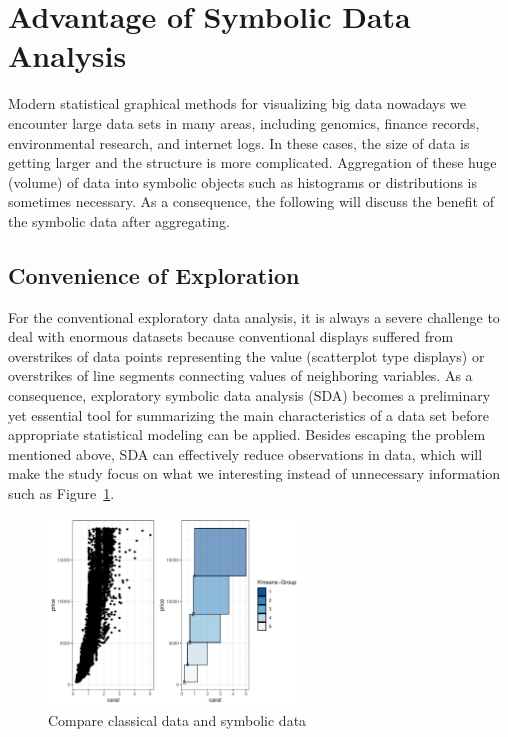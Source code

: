 \documentclass[article]{jss}
\begin{document}

\section{Advantage of Symbolic Data Analysis}

Modern statistical graphical methods for visualizing big data nowadays we encounter large data sets in many areas, including genomics, finance records, environmental research, and internet logs. In these cases, the size of data is getting larger and the structure is more complicated. Aggregation of these huge (volume) of data into symbolic objects such as histograms or distributions is sometimes necessary. As a consequence, the following will discuss the benefit of the symbolic data after aggregating.

\subsection{Convenience of Exploration}

For the conventional exploratory data analysis, it is always a severe challenge to deal with enormous datasets because conventional displays suffered from overstrikes of data points representing the value (scatterplot type displays) or overstrikes of line segments connecting values of neighboring variables. As a consequence, exploratory symbolic data analysis (SDA) becomes a preliminary yet essential tool for summarizing the main characteristics of a data set before appropriate statistical modeling can be applied. Besides escaping the problem mentioned above, SDA can effectively reduce observations in data, which will make the study focus on what we interesting instead of unnecessary information such as Figure~\ref{fig:compare}.

\begin{figure}[htbp]
\centering
\includegraphics[width=0.6\textwidth]{ggESDA_Jiang&Wu_20210915-compare.pdf} 
\caption{\label{fig:compare} Compare classical data and symbolic data}
\end{figure}
\end{document}
